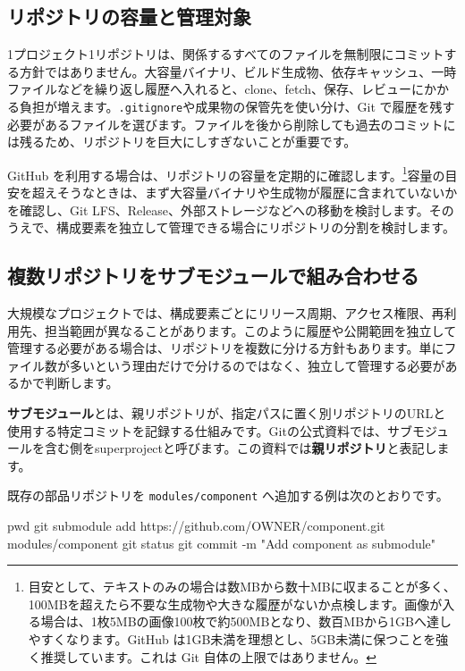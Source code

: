 \documentclass[a4paper,11pt]{jlreq}
\newcommand{\cmd}[1]{\texttt{#1}}
\newcommand{\term}[1]{\textbf{#1}}
\begin{document}
\subsection{リポジトリの容量と管理対象}

1プロジェクト1リポジトリは、関係するすべてのファイルを無制限にコミットする方針ではありません。大容量バイナリ、ビルド生成物、依存キャッシュ、一時ファイルなどを繰り返し履歴へ入れると、clone、fetch、保存、レビューにかかる負担が増えます。\cmd{.gitignore}や成果物の保管先を使い分け、Git で履歴を残す必要があるファイルを選びます。ファイルを後から削除しても過去のコミットには残るため、リポジトリを巨大にしすぎないことが重要です。

GitHub を利用する場合は、リポジトリの容量を定期的に確認します。\footnote{目安として、テキストのみの場合は数MBから数十MBに収まることが多く、100MBを超えたら不要な生成物や大きな履歴がないか点検します。画像が入る場合は、1枚5MBの画像100枚で約500MBとなり、数百MBから1GBへ達しやすくなります。GitHub は1GB未満を理想とし、5GB未満に保つことを強く推奨しています。これは Git 自体の上限ではありません\autocite{github-large-files}。}容量の目安を超えそうなときは、まず大容量バイナリや生成物が履歴に含まれていないかを確認し、Git LFS、Release、外部ストレージなどへの移動を検討します。そのうえで、構成要素を独立して管理できる場合にリポジトリの分割を検討します。

\subsection{複数リポジトリをサブモジュールで組み合わせる}

大規模なプロジェクトでは、構成要素ごとにリリース周期、アクセス権限、再利用先、担当範囲が異なることがあります。このように履歴や公開範囲を独立して管理する必要がある場合は、リポジトリを複数に分ける方針もあります。単にファイル数が多いという理由だけで分けるのではなく、独立して管理する必要があるかで判断します。

\term{サブモジュール}とは、親リポジトリが、指定パスに置く別リポジトリのURLと使用する特定コミットを記録する仕組みです。Gitの公式資料では、サブモジュールを含む側をsuperprojectと呼びます。この資料では\term{親リポジトリ}と表記します。

既存の部品リポジトリを \cmd{modules/component} へ追加する例は次のとおりです。

\begin{codeblock}
pwd
git submodule add https://github.com/OWNER/component.git modules/component
git status
git commit -m "Add component as submodule"
\end{codeblock}
\end{document}
